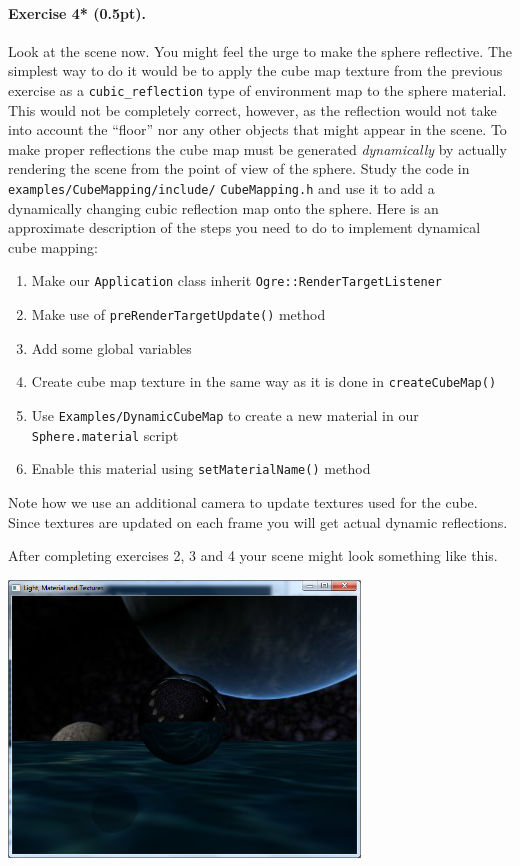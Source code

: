 \documentclass{article}
\newenvironment{exercise}[2]{\paragraph{Exercise #1 (#2pt).} }{
\medskip}
\begin{document}
\begin{exercise}{4*}{0.5}
Look at the scene now. You might feel the urge to make the sphere reflective. The simplest way to do it would be to apply the cube map texture from the previous exercise as a \verb#cubic_reflection# type of environment map to the sphere material. This would not be completely correct, however, as the reflection would not take into account the ``floor'' nor any other objects that might appear in the scene. To make proper reflections the cube map must be generated \emph{dynamically} by actually rendering the scene from the point of view of the sphere. Study the code in \verb#examples/CubeMapping/include/# \verb#CubeMapping.h# and use it to add a dynamically changing cubic reflection map onto the sphere. Here is an approximate description of the steps you need to do to implement dynamical cube mapping:
\begin{enumerate}[noitemsep]
	\item Make our \verb#Application# class inherit \verb#Ogre::RenderTargetListener#
	\item Make use of \verb#preRenderTargetUpdate()# method
	\item Add some global variables
	\item Create cube map texture in the same way as it is done in \verb#createCubeMap()#
	\item Use \verb#Examples/DynamicCubeMap# to create a new material in our \\ \verb#Sphere.material# script
	\item Enable this material using \verb#setMaterialName()# method 	
\end{enumerate}
Note how we use an additional camera to update textures used for the cube. Since textures are updated on each frame you will get actual dynamic reflections.
\end{exercise}

\newpage
After completing exercises 2, 3 and 4 your scene might look something like this. 
\begin{center}
\includegraphics[width=0.7\textwidth]{textures.png}
\end{center}
\end{document}
